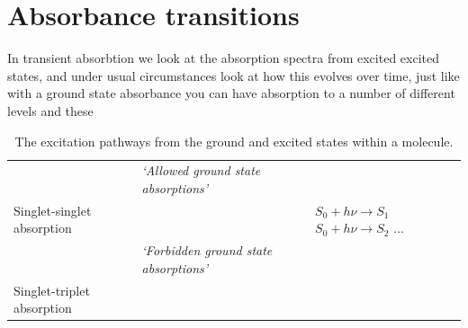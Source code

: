 \documentclass[
]{book}
\begin{document}
\hypertarget{absorbance-transitions}{%
\section{Absorbance transitions}\label{absorbance-transitions}}

In transient absorbtion we look at the absorption spectra from excited excited states, and under usual circumstances look at how this evolves over time, just like with a ground state absorbance you can have absorption to a number of different levels and these

\begin{longtable}[]{@{}lll@{}}
\caption{\label{tab:phototrans} The excitation pathways from the ground and excited states within a molecule.}\tabularnewline
\toprule
\endhead
\begin{minipage}[t]{0.35\columnwidth}\raggedright
\strut
\end{minipage} & \begin{minipage}[t]{0.33\columnwidth}\raggedright
\emph{`Allowed ground state absorptions'}\strut
\end{minipage} & \begin{minipage}[t]{0.23\columnwidth}\raggedright
\strut
\end{minipage}\tabularnewline
\begin{minipage}[t]{0.35\columnwidth}\raggedright
Singlet-singlet absorption\strut
\end{minipage} & \begin{minipage}[t]{0.33\columnwidth}\raggedright
\strut
\end{minipage} & \begin{minipage}[t]{0.23\columnwidth}\raggedright
\(S_0 + h \nu \longrightarrow S_1\) \(S_0 + h \nu \longrightarrow S_2\) \(\dots\)\strut
\end{minipage}\tabularnewline
\begin{minipage}[t]{0.35\columnwidth}\raggedright
\strut
\end{minipage} & \begin{minipage}[t]{0.33\columnwidth}\raggedright
\emph{`Forbidden ground state absorptions'}\strut
\end{minipage} & \begin{minipage}[t]{0.23\columnwidth}\raggedright
\strut
\end{minipage}\tabularnewline
\begin{minipage}[t]{0.35\columnwidth}\raggedright
Singlet-triplet absorption\strut
\end{minipage} & \begin{minipage}[t]{0.33\columnwidth}\raggedright

\end{minipage}
\end{longtable}
\end{document}
